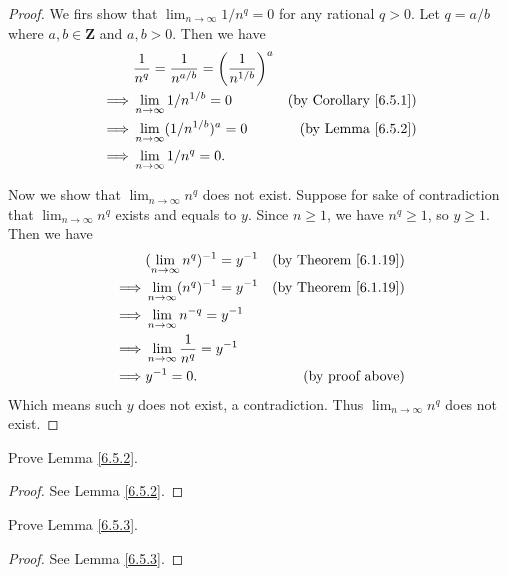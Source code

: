 \begin{proof}
    We firs show that \(\lim_{n \to \infty} 1 / n^q = 0\) for any rational \(q > 0\).
    Let \(q = a / b\) where \(a, b \in \mathbf{Z}\) and \(a, b > 0\).
    Then we have
    \begin{align*}
                 & \frac{1}{n^q} = \frac{1}{n^{a / b}} = \bigg(\frac{1}{n^{1 / b}}\bigg)^a                                     \\
        \implies & \lim_{n \to \infty} 1 / n^{1 / b} = 0                                   & \text{(by Corollary \ref{6.5.1})} \\
        \implies & \lim_{n \to \infty} (1 / n^{1 / b})^a = 0                               & \text{(by Lemma \ref{6.5.2})}     \\
        \implies & \lim_{n \to \infty} 1 / n^q = 0.
    \end{align*}

    Now we show that \(\lim_{n \to \infty} n^q\) does not exist.
    Suppose for sake of contradiction that \(\lim_{n \to \infty} n^q\) exists and equals to \(y\).
    Since \(n \geq 1\), we have \(n^q \geq 1\), so \(y \geq 1\).
    Then we have
    \begin{align*}
                 & (\lim_{n \to \infty} n^q)^{-1} = y^{-1}    & \text{(by Theorem \ref{6.1.19})} \\
        \implies & \lim_{n \to \infty} (n^q)^{-1} = y^{-1}    & \text{(by Theorem \ref{6.1.19})} \\
        \implies & \lim_{n \to \infty} n^{-q} = y^{-1}                                           \\
        \implies & \lim_{n \to \infty} \frac{1}{n^q} = y^{-1}                                    \\
        \implies & y^{-1} = 0.                                & \text{(by proof above)}
    \end{align*}
    Which means such \(y\) does not exist, a contradiction.
    Thus \(\lim_{n \to \infty} n^q\) does not exist.
\end{proof}

\begin{exercise}\label{ex 6.5.2}
    Prove Lemma \ref{6.5.2}.
\end{exercise}

\begin{proof}
    See Lemma \ref{6.5.2}.
\end{proof}

\begin{exercise}\label{ex 6.5.3}
    Prove Lemma \ref{6.5.3}.
\end{exercise}

\begin{proof}
    See Lemma \ref{6.5.3}.
\end{proof}
